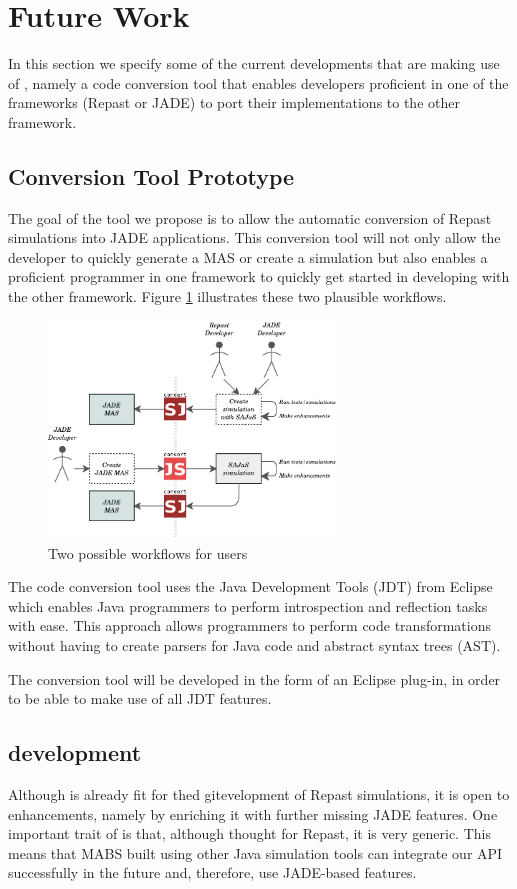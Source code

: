 \section{Future Work}
\label{sec:prototype}

In this section we specify some of the current developments that are making use of \apiname{}, namely a code conversion tool that enables developers proficient in one of the frameworks (Repast or JADE) to port their implementations to the other framework.

\subsection{Conversion Tool Prototype}

The goal of the tool we propose is to allow the automatic conversion of Repast simulations into JADE applications. This conversion tool will not only allow the developer to quickly generate a MAS or create a simulation but also enables a proficient programmer in one framework to quickly get started in developing with the other framework. Figure \ref{fig:prototypeFlow} illustrates these two plausible workflows.

\begin{figure}[h]
	\centering
	\includegraphics[width=3.0in]{figures/prototypeFlow.pdf}
	\caption{
		Two possible workflows for \apiname{} users
	}
	\label{fig:prototypeFlow}
\end{figure}

The code conversion tool uses the Java Development Tools (JDT) from Eclipse which enables Java programmers to perform introspection and reflection tasks with ease. This approach allows programmers to perform code transformations without having to create parsers for Java code and abstract syntax trees (AST).

The conversion tool will be developed in the form of an Eclipse plug-in, in order to be able to make use of all JDT features.

\subsection{\apiname{} development}

Although \apiname{} is already fit for thed gitevelopment of Repast simulations, it is open to enhancements, namely by enriching it with further missing JADE features. One important trait of \apiname{} is that, although thought for Repast, it is very generic. This means that MABS built using other Java simulation tools can integrate our API successfully in the future and, therefore, use JADE-based features.
